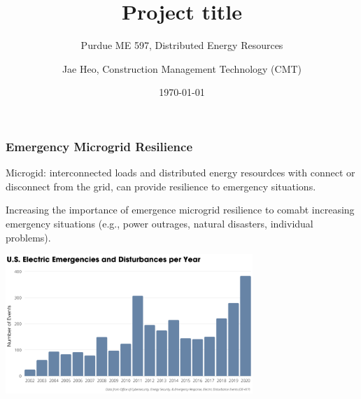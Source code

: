 \documentclass{beamer}
\title{\textbf{Project title}}
\subtitle{Purdue ME 597, Distributed Energy Resources}
\author{Jae Heo, Construction Management Technology (CMT)}
\date{\today}
\begin{document}
\begin{frame}[noframenumbering]
\maketitle
\end{frame}










\begin{frame}
\frametitle{Emergency Microgrid Resilience}

\bit %
\item Microgid: interconnected loads and distributed energy resourdces with connect or disconnect from the grid, can provide resilience to emergency situations. 
\item Increasing the importance of emergence microgrid resilience to comabt increasing emergency situations (e.g., power outrages, natural disasters, individual problems). 

\eit %
\centering

\includegraphics[width=0.7\textwidth]{presentation/intro-1.png}


\end{frame}
\end{document}
